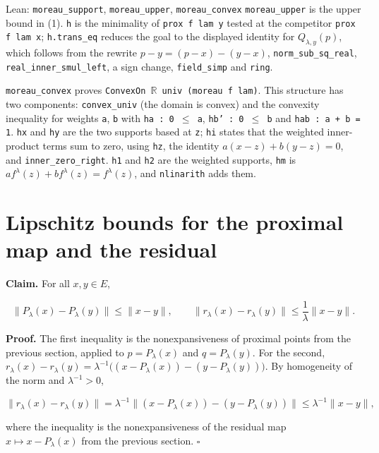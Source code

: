 \documentclass[11pt,a4paper]{article}
\begin{document}
\begin{leanbox}{Lean: \texttt{moreau\_\allowbreak{}support}, \texttt{moreau\_\allowbreak{}upper}, \texttt{moreau\_\allowbreak{}convex}}
\texttt{moreau\_\allowbreak{}upper} is the upper bound in (1). \texttt{h} is the minimality of \texttt{prox f lam y} tested at the competitor \texttt{prox f lam x}; \texttt{h.\allowbreak{}trans\_\allowbreak{}eq} reduces the goal to the displayed identity for \(Q_{\lambda,y}(p)\), which follows from the rewrite \(p-y=(p-x)-(y-x)\), \texttt{norm\_\allowbreak{}sub\_\allowbreak{}sq\_\allowbreak{}real}, \texttt{real\_\allowbreak{}inner\_\allowbreak{}smul\_\allowbreak{}left}, a sign change, \texttt{field\_\allowbreak{}simp} and \texttt{ring}.




\texttt{moreau\_\allowbreak{}convex} proves \texttt{Convex\allowbreak{}On \ensuremath{\mathbb R} univ (moreau f lam)}. This structure has two components: \texttt{convex\_\allowbreak{}univ} (the domain is convex) and the convexity inequality for weights \texttt{a}, \texttt{b} with \texttt{ha : 0 \ensuremath{\le} a}, \texttt{hb' : 0 \ensuremath{\le} b} and \texttt{hab : a + b = 1}. \texttt{hx} and \texttt{hy} are the two supports based at \texttt{z}; \texttt{hi} states that the weighted inner-product terms sum to zero, using \texttt{hz}, the identity \(a(x-z)+b(y-z)=0\), and \texttt{inner\_\allowbreak{}zero\_\allowbreak{}right}. \texttt{h1} and \texttt{h2} are the weighted supports, \texttt{hm} is \(af^\lambda(z)+bf^\lambda(z)=f^\lambda(z)\), and \texttt{nlinarith} adds them.
\end{leanbox}

\section{\texorpdfstring{Lipschitz bounds for the proximal map and the residual}{Lipschitz bounds for the proximal map and the residual}}


\textbf{Claim.} For all \(x,y\in E\),


\[\|P_\lambda(x)-P_\lambda(y)\|\le\|x-y\|,\qquad\|r_\lambda(x)-r_\lambda(y)\|\le\frac1\lambda\|x-y\|.\]


\textbf{Proof.} The first inequality is the nonexpansiveness of proximal points from the previous section, applied to \(p=P_\lambda(x)\) and \(q=P_\lambda(y)\). For the second, \(r_\lambda(x)-r_\lambda(y)=\lambda^{-1}\bigl((x-P_\lambda(x))-(y-P_\lambda(y))\bigr)\). By homogeneity of the norm and \(\lambda^{-1}>0\),


\[\|r_\lambda(x)-r_\lambda(y)\|=\lambda^{-1}\bigl\|(x-P_\lambda(x))-(y-P_\lambda(y))\bigr\|\le\lambda^{-1}\|x-y\|,\]


where the inequality is the nonexpansiveness of the residual map \(x\mapsto x-P_\lambda(x)\) from the previous section. \(\square\)
\end{document}
